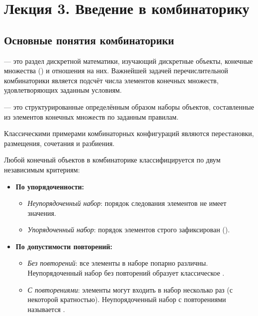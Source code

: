 \section{Лекция 3. Введение в комбинаторику}

\subsection{Основные понятия комбинаторики}

\begin{definition}
     --- это раздел дискретной математики, изучающий 
    дискретные объекты, конечные множества () и отношения на них. Важнейшей задачей перечислительной 
    комбинаторики является подсчёт числа элементов конечных множеств, 
    удовлетворяющих заданным условиям.
\end{definition}

\begin{definition}
     --- это структурированные 
    определённым образом наборы объектов, составленные из элементов 
    конечных множеств по заданным правилам.
\end{definition}

\begin{example}
    Классическими примерами комбинаторных конфигураций являются 
    перестановки, размещения, сочетания и разбиения.
\end{example}

\begin{definition}
    Любой конечный  объектов в комбинаторике классифицируется 
    по двум независимым критериям:
    \begin{itemize}
        \item \textbf{По упорядоченности:}
        \begin{itemize}
            \item \emph{Неупорядоченный набор}: порядок следования элементов 
            не имеет значения.
            \item \emph{Упорядоченный набор}: порядок элементов строго 
            зафиксирован ().
        \end{itemize}
        \item \textbf{По допустимости повторений:}
        \begin{itemize}
            \item \emph{Без повторений}: все элементы в наборе попарно 
            различны. Неупорядоченный набор без повторений образует 
            классическое .
            \item \emph{С повторениями}: элементы могут входить в набор 
            несколько раз (с некоторой кратностью). Неупорядоченный набор с 
            повторениями называется .
        \end{itemize}
    \end{itemize}
\end{definition}

